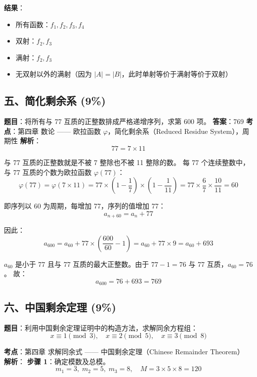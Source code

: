 \documentclass[10pt,a4paper,openany]{ctexbook}
\theoremstyle{definition}
\theoremstyle{remark}
\begin{document}
\textbf{结果}：
\begin{itemize}
\item 所有函数：$f_1, f_2, f_3, f_4$
\item 双射：$f_2, f_3$
\item 满射：$f_2, f_3$
\item 无双射以外的满射（因为 $|A| = |B|$，此时单射等价于满射等价于双射）

\end{itemize}

\vspace{-2pt}

\subsection{五、简化剩余系 (9\%)}

\textbf{题目}：将所有与 77 互质的正整数排成严格递增序列，求第 600 项。
\textbf{答案}：769
\textbf{考点}：第四章 数论 —— 欧拉函数 $\varphi$，简化剩余系（Reduced Residue System），周期性
\textbf{解析}：
\[
77 = 7 \times 11
\]

与 77 互质的正整数就是不被 7 整除也不被 11 整除的数。
每 77 个连续整数中，与 77 互质的个数为欧拉函数 $\varphi(77)$：
\[
\varphi(77) = \varphi(7 \times 11) = 77 \times \left(1 - \frac{1}{7}\right) \times \left(1 - \frac{1}{11}\right) = 77 \times \frac{6}{7} \times \frac{10}{11} = 60
\]

即序列以 60 为周期，每增加 77，序列的值增加 77：
\[
a_{n+60} = a_n + 77
\]

因此：
\[
a_{600} = a_{60} + 77 \times \left(\frac{600}{60} - 1\right) = a_{60} + 77 \times 9 = a_{60} + 693
\]

$a_{60}$ 是小于 77 且与 77 互质的最大正整数。由于 $77 - 1 = 76$ 与 77 互质，$a_{60} = 76$。
故：
\[
a_{600} = 76 + 693 = 769
\]

\vspace{-2pt}

\subsection{六、中国剩余定理 (9\%)}

\textbf{题目}：利用中国剩余定理证明中的构造方法，求解同余方程组：
\[
x \equiv 1 \pmod{3},\quad x \equiv 2 \pmod{5},\quad x \equiv 3 \pmod{8}
\]

\textbf{考点}：第四章 求解同余式 —— 中国剩余定理（Chinese Remainder Theorem）
\textbf{解析}：
\textbf{步骤 1}：确定模数及总模。
\[
m_1 = 3,\; m_2 = 5,\; m_3 = 8,\quad M = 3 \times 5 \times 8 = 120
\]
\end{document}
